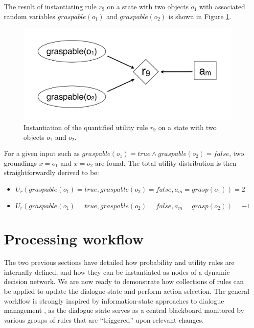 The result of instantiating rule $r_9$ on a state with two objects $o_1$ with associated random variables $\mathit{graspable}(o_1)$ and $\mathit{graspable}(o_2)$ is shown in Figure \ref{fig:quantinstantitionutil}. 

\begin{figure}[h]
\centering
\includegraphics[scale=0.25]{imgs/quantutilruleinstantiation.pdf}
\caption{Instantiation of the quantified utility rule $r_9$ on a state with two objects $o_1$ and $o_2$.}
\label{fig:quantinstantitionutil}
\end{figure}

For a given input such as $\mathit{graspable}(o_1) = true \land \mathit{graspable}(o_2) = false$, two groundings $x=o_1$ and $x=o_2$ are found.  The total utility distribution is then straightforwardly derived to be:
\begin{itemize}
\item $U_r(\mathit{graspable}(o_1)\!=\!true, \mathit{graspable}(o_2)\!=\!false, a_m\!=\!\mathit{grasp}(o_1)) = 2$
\item $U_r(\mathit{graspable}(o_1)\!=\!true, \mathit{graspable}(o_2)\!=\!false, a_m\!=\!\mathit{grasp}(o_2)) = -1$
\end{itemize}

\section{Processing workflow}

The two previous sections have detailed how probability and utility rules are internally defined, and how they can be instantiated as nodes of a dynamic decision network. We are now ready to demonstrate how collections of rules can be applied to update the dialogue state and perform action selection. The general workflow is strongly inspired by information-state approaches to dialogue management \citep{Larsson:2000:ISD:973935.973943,Buckley:2006}, as the dialogue state serves as a central blackboard monitored by various groups of rules that are ``triggered'' upon relevant changes. 

